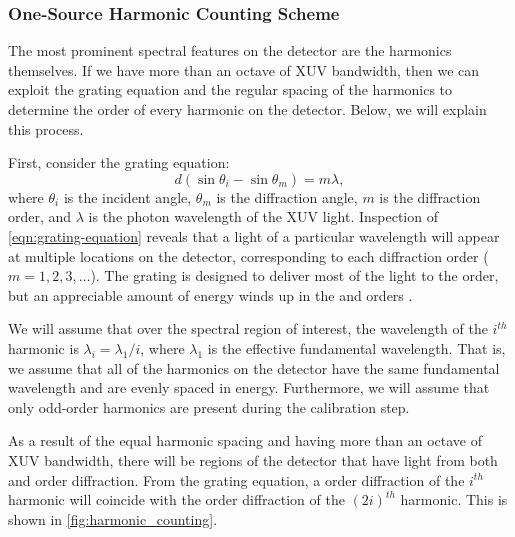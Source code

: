 \subsubsection{One-Source Harmonic Counting Scheme}

The most prominent spectral features on the detector are the harmonics themselves. If we have more than an octave of XUV bandwidth, then we can exploit the grating equation and the regular spacing of the harmonics to determine the order of every harmonic on the detector. Below, we will explain this process.

First, consider the grating equation:
\begin{equation}
d (\sin \theta_i - \sin \theta_m) = m \lambda,
\label{eqn:grating-equation}
\end{equation}
where $\theta_i$ is the incident angle, $\theta_m$ is the diffraction angle, $m$ is the diffraction order, and $\lambda$ is the photon wavelength of the XUV light. Inspection of \cref{eqn:grating-equation} reveals that a light of a particular wavelength will appear at multiple locations on the detector, corresponding to each diffraction order ($m=1, 2, 3, \dots$). The grating is designed to deliver most of the light to the  order, but an appreciable amount of energy winds up in the  and  orders \cite{obryanHighResolutionXUV2015,hagemanComplexAttosecondTransient2020}.

We will assume that over the spectral region of interest, the wavelength of the $i^{th}$ harmonic is $\lambda_i = \lambda_1 / i$, where $\lambda_1$ is the effective fundamental wavelength. That is, we assume that all of the harmonics on the detector have the same fundamental wavelength and are evenly spaced in energy. Furthermore, we will assume that only odd-order harmonics are present during the calibration step.

As a result of the equal harmonic spacing and having more than an octave of XUV bandwidth, there will be regions of the detector that have light from both  and  order diffraction. From the grating equation, a  order diffraction of the $i^{th}$ harmonic will coincide with the  order diffraction of the $(2i)^{th}$ harmonic. This is shown in \cref{fig:harmonic_counting}.

